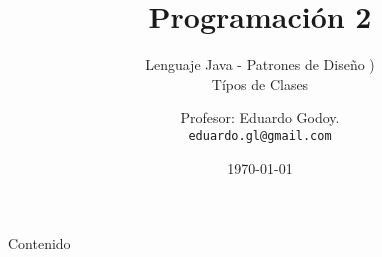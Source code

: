 \documentclass[]{beamer}
\title[Programaci\'on 2]{Programaci\'on 2}
\subtitle{Lenguaje Java - Patrones de Diseño )\\ T\'ipos de Clases}
\date{
	\today}
\author[Eduardo Godoy]{
	Profesor: Eduardo Godoy. \\
	\vspace{0.5mm}
	\texttt{\small eduardo.gl@gmail.com}
}
\institute[Universidad de Valara\'iso]{
	\vspace{0.25cm}
	\texttt Escuela de Ingenier\'ia Civil Inform\'atica.\\
	\texttt Universidad de Valpara\'iso.
}
\begin{document}
\frame{\titlepage}
\section[]{}
\begin{frame}{Contenido}
	\tableofcontents
\end{frame}



\section{}
\end{document}
